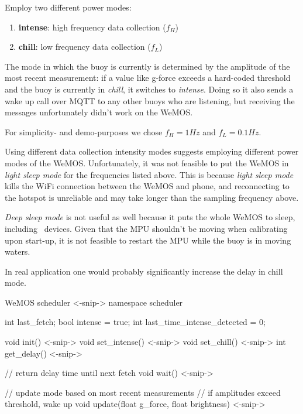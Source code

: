 \documentclass{article}
\begin{document}
\begin{multicols}{2}

\begin{_block}[]
Employ two different power modes:
\begin{enumerate}
    \item \textbf{intense}: high frequency data collection ($f_H$)
    \item \textbf{chill}: low frequency data collection ($f_L$)
\end{enumerate}
\end{_block}

The mode in which the buoy is currently is determined by the amplitude of the most recent measurement: if a value like g-force exceeds a hard-coded threshold and the buoy is currently in \textit{chill}, it switches to \textit{intense}. Doing so it also sends a wake up call over MQTT to any other buoys who are listening, but receiving the messages unfortunately didn't work on the WeMOS.

For simplicity- and demo-purposes we chose $f_H=1Hz$ and $f_L=0.1Hz$.

Using different data collection intensity modes suggests employing different power modes of the WeMOS. Unfortunately, it was not feasible to put the WeMOS in \textit{light sleep mode} for the frequencies listed above. This is because \textit{light sleep mode} kills the WiFi connection between the WeMOS and phone, and reconnecting to the hotspot is unreliable and may take longer than the sampling frequency above.

\textit{Deep sleep mode} is not useful as well because it puts the whole WeMOS to sleep, including \ISquaredC\ devices. Given that the MPU shouldn't be moving when calibrating upon start-up, it is not feasible to restart the MPU while the buoy is in moving waters.

In real application one would probably significantly increase the delay in chill mode.

\begin{code}[c]{WeMOS scheduler}
<-snip->
namespace scheduler {
    int last_fetch;
    bool intense = true;
    int last_time_intense_detected = 0;
    
    void init() { <-snip-> }
    void set_intense(){ <-snip-> }
    void set_chill(){ <-snip-> }
    int get_delay(){ <-snip-> }

    // return delay time until next fetch
    void wait() { <-snip-> }
    
    // update mode based on most recent measurements
    // if amplitudes exceed threshold, wake up
    void update(float g_force, float brightness){ <-snip-> }
}
\end{code}

\end{multicols}
\end{document}
